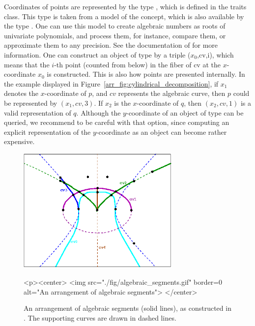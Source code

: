Coordinates of points are represented by the type ,
which is defined in the traits class. 
This type is taken from a model of the  concept,
which is also available by the type .
One can use this model to create algebraic numbers as roots of univariate
polynomials, and process them, for instance, 
compare them, or approximate them to any precision. See the documentation
of  for more information.
One can construct an object of type  by a triple
($x_0$,cv,i), which means that the $i$-th point (counted from below)
in the fiber of cv at the $x$-coordinate $x_0$ is constructed.
This is also how points are presented internally. 
In the example displayed in Figure~\ref{arr_fig:cylindrical_decomposition},
if $x_1$ denotes the $x$-coordinate of $p$, and $cv$ represents the algebraic
curve, then $p$ could be represented by $(x_1,cv,3)$. If $x_2$
is the $x$-coordinate of $q$, 
then $(x_2,cv,1)$ is a valid representation of $q$.
Although the $y$-coordinate of an object of type  can be queried,
we recommend to be careful with that option, since computing an explicit
representation of the $y$-coordinate as an  object
can become rather expensive.

\begin{figure}[t]
\begin{ccTexOnly}
 \begin{center}
 
\includegraphics[width=8cm]{Arrangement_on_surface_2/fig/algebraic_segments}
 \end{center}
\end{ccTexOnly}
\begin{ccHtmlOnly}
 <p><center>
 <img src="./fig/algebraic_segments.gif" border=0 alt="An arrangement of algebraic segments">
 </center>
\end{ccHtmlOnly}
\caption{An arrangement of algebraic segments (solid lines),
as constructed in . The supporting curves
are drawn in dashed lines.\label{arr_fig:ex_alg_segments}}
\end{figure}

